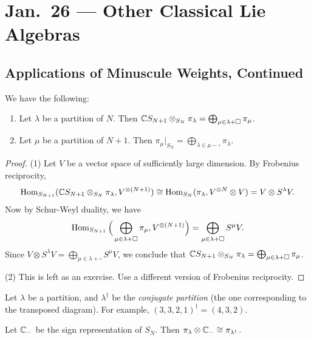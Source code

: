 \chapter{Jan.~26 --- Other Classical Lie Algebras}

\section{Applications of Minuscule Weights, Continued}
\begin{prop}
  We have the following:
  \begin{enumerate}
    \item Let $\lambda$ be a partition of
      $N$. Then
      $\mathbb{C} S_{N + 1} \otimes_{S_{N}} \pi_\lambda
        = \bigoplus_{\mu \in \lambda + \square} \pi_\mu$.
    \item Let $\mu$ be a partition
      of $N + 1$. Then
      $\pi_\mu|_{S_N}
        = \bigoplus_{\lambda \in \mu - \square} \pi_\lambda$.
  \end{enumerate}
\end{prop}

\begin{proof}
  (1) Let $V$ be a vector space of
  sufficiently large dimension.
  By Frobenius reciprocity,
  \[
    \operatorname{Hom}_{S_{N + 1}}(\mathbb{C} S_{N + 1} \otimes_{S_N} \pi_\lambda, V^{\otimes (N + 1)})
    \cong \operatorname{Hom}_{S_N}(\pi_\lambda, V^{\otimes N} \otimes V)
    = V \otimes S^\lambda V.
  \]
  Now by Schur-Weyl duality, we have
  \[
    \operatorname{Hom}_{S_{N + 1}}
    \Big(\bigoplus_{\mu \in \lambda + \square} \pi_\mu, V^{\otimes(N + 1)}\Big)
    = \bigoplus_{\mu \in \lambda + \square} S^\mu V.
  \]
  Since $V \otimes S^\lambda V
    = \bigoplus_{\mu \in \lambda + \square} S^\mu V$,
    we conclude that
    $\mathbb{C} S_{N + 1} \otimes_{S_N} \pi_\lambda
      = \bigoplus_{\mu \in \lambda + \square} \pi_\mu$.

  (2) This is left as an exercise. Use
  a different version of Frobenius reciprocity.
\end{proof}

\begin{definition}
  Let $\lambda$ be a partition, and
  $\lambda^\dagger$ be the
  \emph{conjugate partition}
  (the one corresponding to the
  transposed diagram). For example,
  $(3, 3, 2, 1)^\dagger = (4, 3, 2)$.
\end{definition}

\begin{corollary}
  Let $\mathbb{C}_-$ be the sign representation
  of $S_N$. Then
  $\pi_\lambda \otimes \mathbb{C}_- \cong \pi_{\lambda^\dagger}$.
\end{corollary}

